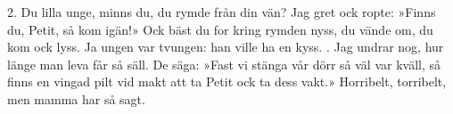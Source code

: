 \setlength{\columnsep}{0.2cm}
\begin{multicols}{2}
2.  Du lilla unge, minns du,
    du rymde från din vän?
    Jag gret ock ropte: »Finns du,
    Petit, så kom igän!»
    Ock bäst du for kring rymden nyss,
    du vände om, du kom ock lyss.
    Ja ungen
    var tvungen:
    han ville ha en kyss.
\vfill{}.  Jag undrar nog, hur länge
    man leva får så säll.
    De säga: »Fast vi stänga
    vår dörr så väl var kväll,
    så finns en vingad pilt vid makt
    att ta Petit ock ta dess vakt.»
    Horribelt,
    torribelt,
    men mamma har så sagt.
\end{multicols}